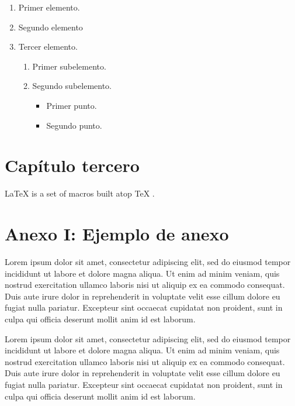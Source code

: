 \documentclass[12pt,a4paper]{report}
\newcommand{\headlinecolor}{\color{slcolor}}
\begin{document}
\begin{enumerate}[label=\bfseries\headlinecolor\arabic*.]
\item Primer elemento.
\item Segundo elemento
\item Tercer elemento.
\begin{enumerate}[label=\alph*)]
\item Primer subelemento.
\item Segundo subelemento.
\begin{itemize}[label=$\bullet$]
\item Primer punto.
\item Segundo punto.
\end{itemize}

\end{enumerate}

\end{enumerate}


\chapter{Capítulo tercero}\label{cap:cap3}



\LaTeX{} \cite{latex2e} is a set of macros built atop \TeX{} \cite{texbook}.

\appendix
\chapter{Anexo I: Ejemplo de anexo}\label{cap:anexo1}
Lorem ipsum dolor sit amet, consectetur adipiscing elit, sed do eiusmod tempor incididunt ut labore et dolore magna aliqua. Ut enim ad minim veniam, quis nostrud exercitation ullamco laboris nisi ut aliquip ex ea commodo consequat. Duis aute irure dolor in reprehenderit in voluptate velit esse cillum dolore eu fugiat nulla pariatur. Excepteur sint occaecat cupidatat non proident, sunt in culpa qui officia deserunt mollit anim id est laborum.

Lorem ipsum dolor sit amet, consectetur adipiscing elit, sed do eiusmod tempor incididunt ut labore et dolore magna aliqua. Ut enim ad minim veniam, quis nostrud exercitation ullamco laboris nisi ut aliquip ex ea commodo consequat. Duis aute irure dolor in reprehenderit in voluptate velit esse cillum dolore eu fugiat nulla pariatur. Excepteur sint occaecat cupidatat non proident, sunt in culpa qui officia deserunt mollit anim id est laborum.
\end{document}
